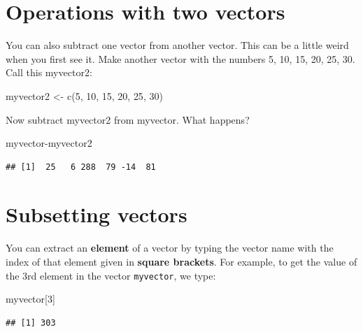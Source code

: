 \documentclass[
]{book}
\newenvironment{Shaded}{\begin{snugshade}}{\end{snugshade}}
\newcommand{\DecValTok}[1]{\textcolor[rgb]{0.00,0.00,0.81}{#1}}
\newcommand{\FunctionTok}[1]{\textcolor[rgb]{0.00,0.00,0.00}{#1}}
\newcommand{\NormalTok}[1]{#1}
\newcommand{\OtherTok}[1]{\textcolor[rgb]{0.56,0.35,0.01}{#1}}
\newcommand{\SpecialCharTok}[1]{\textcolor[rgb]{0.00,0.00,0.00}{#1}}
\begin{document}
\hypertarget{operations-with-two-vectors}{%
\section{Operations with two vectors}\label{operations-with-two-vectors}}

You can also subtract one vector from another vector. This can be a little weird when you first see it. Make another vector with the numbers 5, 10, 15, 20, 25, 30. Call this myvector2:

\begin{Shaded}
\begin{Highlighting}[]
\NormalTok{myvector2 }\OtherTok{\textless{}{-}} \FunctionTok{c}\NormalTok{(}\DecValTok{5}\NormalTok{, }\DecValTok{10}\NormalTok{, }\DecValTok{15}\NormalTok{, }\DecValTok{20}\NormalTok{, }\DecValTok{25}\NormalTok{, }\DecValTok{30}\NormalTok{)}
\end{Highlighting}
\end{Shaded}

Now subtract myvector2 from myvector. What happens?

\begin{Shaded}
\begin{Highlighting}[]
\NormalTok{myvector}\SpecialCharTok{{-}}\NormalTok{myvector2}
\end{Highlighting}
\end{Shaded}

\begin{verbatim}
## [1]  25   6 288  79 -14  81
\end{verbatim}

\hypertarget{subsetting-vectors}{%
\section{Subsetting vectors}\label{subsetting-vectors}}

You can extract an \textbf{element} of a vector by typing the vector name with the index of that element given in \textbf{square brackets}. For example, to get the value of the 3rd element in the vector \texttt{myvector}, we type:

\begin{Shaded}
\begin{Highlighting}[]
\NormalTok{myvector[}\DecValTok{3}\NormalTok{]}
\end{Highlighting}
\end{Shaded}

\begin{verbatim}
## [1] 303
\end{verbatim}
\end{document}

